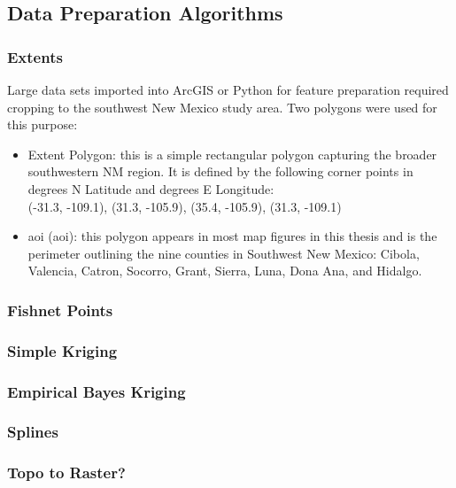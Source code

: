 \subsection{Data Preparation Algorithms}

\subsubsection{Extents}

Large data sets imported into ArcGIS or Python for feature preparation required cropping to the southwest New Mexico study area. Two polygons were used for this purpose:

\begin{itemize}
\item Extent Polygon: this is a simple rectangular polygon capturing the broader southwestern NM region. It is defined by the following corner points in degrees N Latitude and degrees E Longitude: \\ (-31.3, -109.1), (31.3, -105.9), (35.4, -105.9), (31.3, -109.1)
\item \acrlong{aoi} (\acrshort{aoi}): this polygon appears in most map figures in this thesis and is the perimeter outlining the nine counties in Southwest New Mexico: Cibola, Valencia, Catron, Socorro, Grant, Sierra, Luna, Dona Ana, and Hidalgo.
\end{itemize}

\subsubsection{Fishnet Points}\label{ssn:fishnet}

\subsubsection{Simple Kriging}\label{ssn:kriging}

\subsubsection{Empirical Bayes Kriging}\label{ssn:ebk}

\subsubsection{Splines}

\subsubsection{Topo to Raster?}

